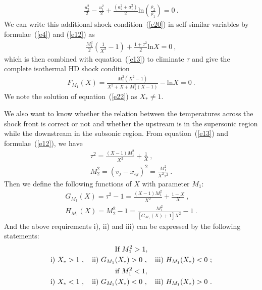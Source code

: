 \documentclass[fleqn,usenatbib]{mnras}
\begin{document}
\begin{gather}
\frac{u_{2}^{2}}{2}-\frac{u_{1}^{2}}{2}+\frac{\left(a_{2}^{2}+a_{1}^{2}\right)}{2}\mathrm{ln}\left(\frac{\rho_{2}}{\rho_{1}}\right)=0\label{e20}\ .
\end{gather}
We can write this additional shock condition~(\ref{e20}) in self-similar variables by formulae~(\ref{e4}) and (\ref{e12}) as
\begin{gather}
\frac{M_{1}^{2}}{2}\left(\frac{1}{X^{2}}-1\right)+\frac{1+\tau^{2}}{2}\mathrm{ln}X=0\label{e21}\ ,
\end{gather}
which is then combined with equation~(\ref{e13}) to eliminate $\tau$ and give the complete isothermal HD shock condition
\begin{gather}
F_{M_{1}}(X)=\frac{M_{1}^{2}\left(X^{2}-1\right)}{X^{2}+X+M_{1}^{2}(X-1)}-\mathrm{ln}X=0\label{e22}\ .
\end{gather}
We note the solution of equation~(\ref{e22}) as $X_{*}\neq 1$.

We also want to know whether the relation between the temperatures across the shock front is correct or not and whether the upstream is in the supersonic region while the downstream in the subsonic region. From equation~(\ref{e13}) and formulae~(\ref{e12}), we have
\begin{gather}
\tau^{2}=\frac{(X-1)M_{1}^{2}}{X^{2}}+\frac{1}{X}\ ,\label{e23}\\
M_{2}^{2}=\left(v_{j}-x_{sj}\right)^{2}=\frac{M_{1}^{2}}{X^{2}\tau^{2}} \label{e24}\ .
\end{gather}
Then we define the following functions of $X$ with parameter $M_{1}$:
\begin{gather}
G_{M_{1}}(X)=\tau^{2}-1=\frac{(X-1)M_{1}^{2}}{X^{2}}+\frac{1-X}{X}\label{e25}\ ,\\
H_{M_{1}}(X)=M_{2}^{2}-1=\frac{M_{1}^{2}}{\left[G_{M_{1}}(X)+1\right]X^{2}}-1\label{e26}\ .
\end{gather}
And the above requirements i), ii) and iii) can be expressed by the following statements:
\begin{gather}
\text{If }M_{1}^{2}>1,\notag\\
\text{i) }X_{*}>1\ ,\quad\text{ii) } G_{M_{1}}(X_{*})>0\ ,\quad\text{iii) } H_{M_{1}}(X_{*})<0\ ;\label{e27}\\
\text{if }M_{1}^{2}<1,\notag\\
\text{i) }X_{*}<1\ ,\quad\text{ii) } G_{M_{1}}(X_{*})<0\ ,\quad\text{iii) } H_{M_{1}}(X_{*})>0\ .\label{e28}
\end{gather}
\end{document}

